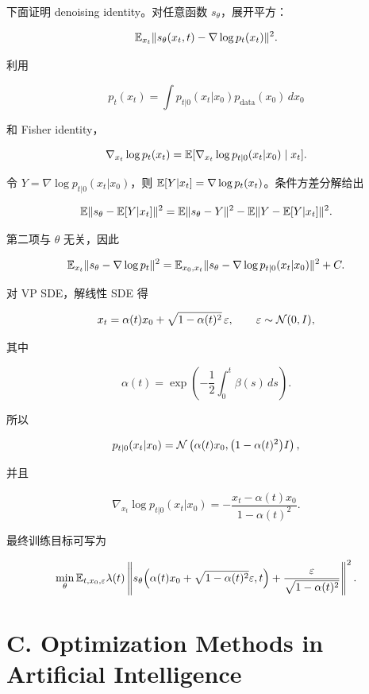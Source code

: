 下面证明 denoising identity。对任意函数 \(s_\theta\)，展开平方：

\[
  \mathbb{E}_{x_t}\|s_\theta(x_t,t)-\nabla\log p_t(x_t)\|^2.
\]

利用

\[
  p_t(x_t)=\int p_{t|0}(x_t|x_0)p_{\text{data}}(x_0)\,dx_0
\]

和 Fisher identity，

\[
  \nabla_{x_t}\log p_t(x_t)
  =
  \mathbb{E}[\nabla_{x_t}\log p_{t|0}(x_t|x_0)\mid x_t].
\]

令 \(Y=\nabla\log p_{t|0}(x_t|x_0)\)，则 \(\mathbb{E}[Y|x_t]=\nabla\log p_t(x_t)\)。条件方差分解给出

\[
  \mathbb{E}\|s_\theta-\mathbb{E}[Y|x_t]\|^2
  =
  \mathbb{E}\|s_\theta-Y\|^2
  -
  \mathbb{E}\|Y-\mathbb{E}[Y|x_t]\|^2.
\]

第二项与 \(\theta\) 无关，因此

\[
  \mathbb{E}_{x_t}\|s_\theta-\nabla\log p_t\|^2
  =
  \mathbb{E}_{x_0,x_t}\|s_\theta-\nabla\log p_{t|0}(x_t|x_0)\|^2+C.
\]

对 VP SDE，解线性 SDE 得

\[
  x_t=\alpha(t)x_0+\sqrt{1-\alpha(t)^2}\,\varepsilon,
  \qquad
  \varepsilon\sim \mathcal{N}(0,I),
\]

其中

\[
  \alpha(t)=\exp\left(-\frac12\int_0^t\beta(s)\,ds\right).
\]

所以

\[
  p_{t|0}(x_t|x_0)
  =
  \mathcal{N}\left(\alpha(t)x_0,\bigl(1-\alpha(t)^2\bigr)I\right),
\]

并且

\[
  \nabla_{x_t}\log p_{t|0}(x_t|x_0)
  =
  -\frac{x_t-\alpha(t)x_0}{1-\alpha(t)^2}.
\]

最终训练目标可写为

\[
  \min_\theta
  \mathbb{E}_{t,x_0,\varepsilon}
  \lambda(t)
  \left\|
    s_\theta\!\left(\alpha(t)x_0+\sqrt{1-\alpha(t)^2}\varepsilon,t\right)
    +
    \frac{\varepsilon}{\sqrt{1-\alpha(t)^2}}
  \right\|^2.
\]

\section{C. Optimization Methods in Artificial Intelligence}

